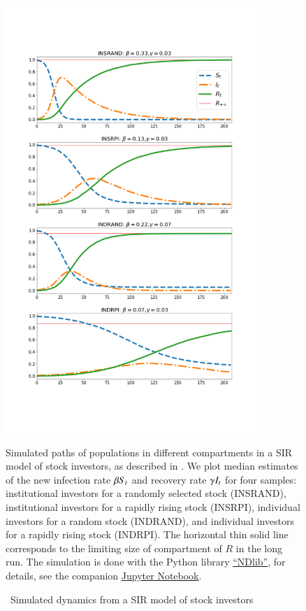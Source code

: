     \begin{figure} \centering  %
        \caption{ ~Simulated dynamics from a SIR model of stock investors}
        \label{fig:sir_simulate}
        \centerline{\includegraphics[width=0.85\textwidth,height=0.85\textheight]{./figures/sir_simulate}}
        \begin{flushleft}
            {\footnotesize Simulated paths of populations in different compartments in a SIR model of stock investors, as described in \cite{shiller1989survey}. We plot median estimates of the new infection rate $\beta \Susceptible_{t}$ and recovery rate $\gamma \Infected_{t}$ for four samples: institutional investors for a randomly selected stock (INSRAND), institutional investors for a rapidly rising stock (INSRPI), individual investors for a random stock (INDRAND), and individual investors for a rapidly rising stock (INDRPI). The horizontal thin solid line corresponds to the limiting size of compartment of $R$ in the long run. The simulation is done with the Python library \href{https://ndlib.readthedocs.io/en/latest/}{``NDlib''}, for details, see the companion \href{https://econ-ark.org/materials/epiexp?launch}{Jupyter Notebook}. }
        \end{flushleft}
    \end{figure}
